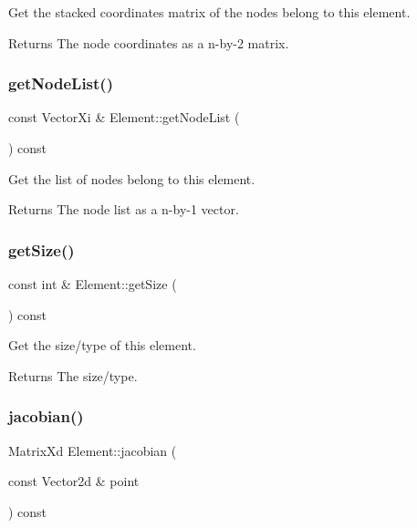 Get the stacked coordinates matrix of the nodes belong to this element. 

\begin{DoxyReturn}{Returns}
The node coordinates as a n-\/by-\/2 matrix. 
\end{DoxyReturn}
\mbox{\label{class_element_a763e0e4a46e68823903557a605dc5474}} 
\subsubsection{\texorpdfstring{get\+Node\+List()}{getNodeList()}}
{\footnotesize\ttfamily const Vector\+Xi \& Element\+::get\+Node\+List (\begin{DoxyParamCaption}{ }\end{DoxyParamCaption}) const}



Get the list of nodes belong to this element. 

\begin{DoxyReturn}{Returns}
The node list as a n-\/by-\/1 vector. 
\end{DoxyReturn}
\mbox{\label{class_element_a0221b246d9ca632136cc39790c46ee8f}} 
\subsubsection{\texorpdfstring{get\+Size()}{getSize()}}
{\footnotesize\ttfamily const int \& Element\+::get\+Size (\begin{DoxyParamCaption}{ }\end{DoxyParamCaption}) const}



Get the size/type of this element. 

\begin{DoxyReturn}{Returns}
The size/type. 
\end{DoxyReturn}
\mbox{\label{class_element_ae0c7de742f6835b6ede7d28fa73c7594}} 
\subsubsection{\texorpdfstring{jacobian()}{jacobian()}}
{\footnotesize\ttfamily Matrix\+Xd Element\+::jacobian (\begin{DoxyParamCaption}\item[{const Vector2d \&}]{point }\end{DoxyParamCaption}) const}



